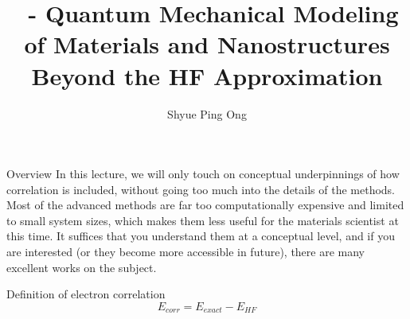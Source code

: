 \documentclass[aspectratio=169]{beamer}
\title[\classname Beyond the HF Approximation]{\classname~- Quantum Mechanical Modeling of Materials and Nanostructures\\Beyond the HF Approximation}
\author{Shyue Ping Ong}
\institute[UCSD]{University of California, San Diego\\
\medskip
}
\date{\classyear} %
\begin{document}
\begin{frame}
    \titlepage %
\end{frame}

\begin{frame}{Overview}
In this lecture, we will only touch on conceptual underpinnings of how correlation is included, without going too much into the details of the methods. Most of the advanced methods are far too computationally expensive and limited to small system sizes, which makes them less useful for the materials scientist at this time. It suffices that you understand them at a conceptual level, and if you are interested (or they become more accessible in future), there are many excellent works on the subject.


\begin{alertblock}{Definition of electron correlation}
\begin{equation*}
    E_{corr} = E_{exact} - E_{HF} 
\end{equation*}
\end{alertblock}

\end{frame}
\end{document}
